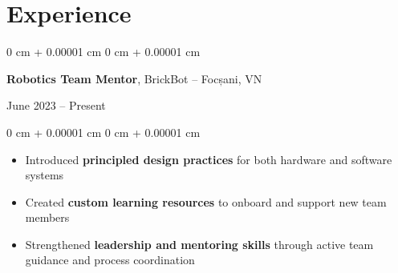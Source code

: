 \documentclass[10pt, letterpaper]{article}
\newenvironment{highlights}{
    \begin{itemize}[
        topsep=0.10 cm,
        parsep=0.10 cm,
        partopsep=0pt,
        itemsep=0pt,
        leftmargin=0 cm + 10pt
    ]
}{
    \end{itemize}
} %
\newenvironment{onecolentry}{
    \begin{adjustwidth}{
        0 cm + 0.00001 cm
    }{
        0 cm + 0.00001 cm
    }
}{
    \end{adjustwidth}
} %
\newenvironment{twocolentry}[2][]{
    \onecolentry
    \def\secondColumn{#2}
    \setcolumnwidth{\fill, 4.5 cm}
    \begin{paracol}{2}
}{
    \switchcolumn \raggedleft \secondColumn
    \end{paracol}
    \endonecolentry
} %
\begin{document}
\section{Experience}

        \begin{twocolentry}{
    June 2023 – Present
}
    \textbf{Robotics Team Mentor}, BrickBot -- Focșani, VN
\end{twocolentry}

\vspace{0.10 cm}
\begin{onecolentry}
    \begin{highlights}
        \item Introduced \textbf{principled design practices} for both hardware and software systems
        \item Created \textbf{custom learning resources} to onboard and support new team members
        \item Strengthened \textbf{leadership and mentoring skills} through active team guidance and process coordination
    \end{highlights}
\end{onecolentry}
\end{document}
